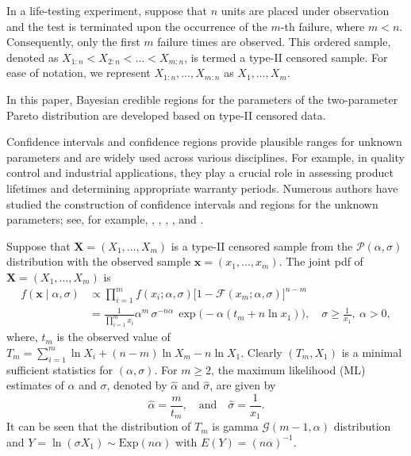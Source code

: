 \documentclass[twoside]{article}
\begin{document}
In a life-testing experiment, suppose that $n$ units are placed under observation and the test is terminated upon the occurrence of the $m$-th failure, where $m<n$. Consequently, only the first $m$ failure times are observed. This ordered sample, denoted as $X_{1:n} < X_{2:n} < \dots < X_{m:n}$, is termed a type-II censored sample. For ease of notation, we represent $X_{1:n}, \dots, X_{m:n}$ as $X_1, \dots, X_m$.

In this paper, Bayesian credible regions for the parameters of the two-parameter Pareto distribution are developed based on type-II censored data.

Confidence intervals and confidence regions provide plausible ranges for unknown parameters and are widely used across various disciplines. For example, in quality control and industrial applications, they play a crucial role in assessing product lifetimes and determining appropriate warranty periods. Numerous authors have studied the construction of confidence intervals and regions for the unknown parameters; see, for example, \cite{Asgharzadeh2017,Asgharzadeh2020}, \cite{Fernandez2012,Fernandez2013,Fernandez2023}, \cite{Lennartz2021}, \cite{Saadati-Asgharzadeh-2025,Saadati-et-al-2025}, and \cite{Wu2022}.

Suppose that $\mathbf{X}=(X_1,\dots,X_m)$ is a type-II censored sample from the $\mathcal{P}(\alpha,\sigma)$ distribution with the observed sample $\mathbf{x}=(x_1,\dots,x_m)$. The joint pdf of $\mathbf{X}=(X_1,\dots,X_m)$ is
%
\begin{align}
	f(\mathbf{x}\mid\alpha,\sigma)&\propto\prod_{i=1}^{m}f(x_i;\alpha,\sigma)\big[1-\mathcal{F}(x_m;\alpha,\sigma)\big]^{n-m}\nonumber\\
	&=\frac{1}{\prod_{i=1}^{m}x_i}\alpha^m\,\sigma^{-n\alpha}\,\exp\big(-\alpha (t_m+n\ln x_1)\big),\quad \sigma\ge \frac{1}{x_1},~\alpha>0,
	\label{likelihood-function}
\end{align}
where, $t_m$  is the observed value of $T_m=\sum_{i=1}^{m}\ln X_i+(n-m)\ln X_m-n\ln X_1$. Clearly $(T_m,X_1)$ is a minimal sufficient statistics for $(\alpha,\sigma)$. For $m\ge 2$, the maximum likelihood (ML) estimates of $\alpha$ and $\sigma$, denoted by $\widehat{\alpha}$ and $\widehat{\sigma}$, are given by
\[
\widehat{\alpha}=\frac{m}{t_m},\quad\textrm{and}\quad \widehat{\sigma}=\frac{1}{x_1}.
\]
It can be seen that the distribution of $T_m$ is gamma $\mathcal{G}(m-1, \alpha)$ distribution and $Y=\ln(\sigma X_1)\sim \textrm{Exp}(n\alpha)$ with $E(Y)=(n\alpha)^{-1}$.
\end{document}
